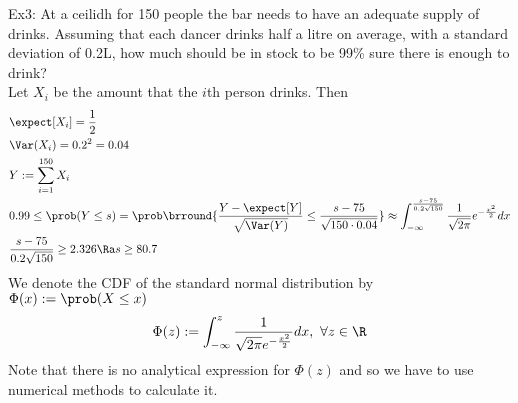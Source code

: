 Ex3: At a ceilidh for 150 people the bar needs to have an adequate supply of drinks. Assuming that each dancer drinks half a litre on average, with a standard deviation of 0.2L, how much should be in stock to be 99\% sure there is enough to drink?\\
Let $X_i$ be the amount that the $i$th person drinks. Then
\begin{align*}
    &\expect[X_i]=\frac{1}{2}\\
    &\Var(X_i)=0.2^2=0.04\\
    &Y:=\sum_{i=1}^{150}X_i\\
    &0.99\leq\prob(Y\leq s)=\prob\brround{\frac{Y-\expect[Y]}{\sqrt{\Var(Y)}}\leq\frac{s-75}{\sqrt{150\cdot0.04}}}\approx\int_{-\infty}^{\frac{s-75}{0.2\sqrt{150}}}\frac{1}{\sqrt{2\pi}}e^{-\frac{x^2}{2}}dx\\
    &\frac{s-75}{0.2\sqrt{150}}\geq 2.326\Ra s\geq 80.7
\end{align*}
We denote the CDF of the standard normal distribution by $\Phi(x):=\prob(X\leq x)$
\[\Phi(z):=\int_{-\infty}^z\frac{1}{\sqrt{2\pi}e^{-\frac{x^2}{2}}}dx,\ \forall z\in\R\]
Note that there is no analytical expression for $\Phi(z)$ and so we have to use numerical methods to calculate it.\\

